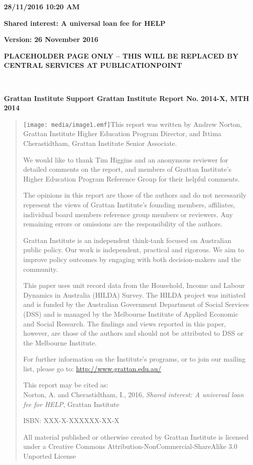 \documentclass[]{book}
\date{}
\begin{document}
\textbf{28/11/2016 10:20 AM}

\textbf{Shared interest: A universal loan fee for HELP}

\textbf{Version: 26 November 2016}

\textbf{PLACEHOLDER PAGE ONLY -- THIS WILL BE REPLACED BY CENTRAL SERVICES AT PUBLICATIONPOINT}

\protect\hypertarget{_Toc259022864}{}{\protect\hypertarget{_Toc259023048}{}{\protect\hypertarget{_Toc259023191}{}{\protect\hypertarget{_Toc259023307}{}{\protect\hypertarget{_Toc259022865}{}{\protect\hypertarget{_Toc259023049}{}{\protect\hypertarget{_Toc259023192}{}{\protect\hypertarget{_Toc259023308}{}{}}}}}}}}\textbf{\\
}

\textbf{Grattan Institute Support Grattan Institute Report No. 2014-X, MTH 2014}

\begin{quote}
\texttt{[image: media/image1.emf]}This report was written by Andrew Norton, Grattan Institute Higher Education Program Director, and Ittima Cherastidtham, Grattan Institute Senior Associate.

We would like to thank Tim Higgins and an anonymous reviewer for detailed comments on the report, and members of Grattan Institute's Higher Education Program Reference Group for their helpful comments.

The opinions in this report are those of the authors and do not necessarily represent the views of Grattan Institute's founding members, affiliates, individual board members reference group members or reviewers. Any remaining errors or omissions are the responsibility of the authors.

Grattan Institute is an independent think-tank focused on Australian public policy. Our work is independent, practical and rigorous. We aim to improve policy outcomes by engaging with both decision-makers and the community.

This paper uses unit record data from the Household, Income and Labour Dynamics in Australia (HILDA) Survey. The HILDA project was initiated and is funded by the Australian Government Department of Social Services (DSS) and is managed by the Melbourne Institute of Applied Economic and Social Research. The findings and views reported in this paper, however, are those of the authors and should not be attributed to DSS or the Melbourne Institute.

For further information on the Institute's programs, or to join our mailing list, please go to: \url{http://www.grattan.edu.au/}

This report may be cited as:\\
Norton, A. and Cherastidtham, I., 2016, \emph{Shared interest: A universal loan fee for HELP}, Grattan Institute

ISBN: XXX-X-XXXXXX-XX-X

All material published or otherwise created by Grattan Institute is licensed under a Creative Commons Attribution-NonCommercial-ShareAlike 3.0 Unported License
\end{quote}
\end{document}
